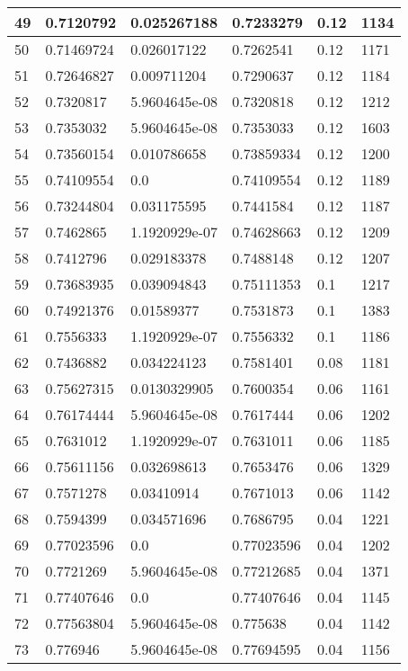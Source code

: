 \begin{longtable}{|l|l|l|l|l|l|}
49 & 0.7120792 & 0.025267188 & 0.7233279 & 0.12 & 1134 \\ \hline 
50 & 0.71469724 & 0.026017122 & 0.7262541 & 0.12 & 1171 \\ \hline 
51 & 0.72646827 & 0.009711204 & 0.7290637 & 0.12 & 1184 \\ \hline 
52 & 0.7320817 & 5.9604645e-08 & 0.7320818 & 0.12 & 1212 \\ \hline 
53 & 0.7353032 & 5.9604645e-08 & 0.7353033 & 0.12 & 1603 \\ \hline 
54 & 0.73560154 & 0.010786658 & 0.73859334 & 0.12 & 1200 \\ \hline 
55 & 0.74109554 & 0.0 & 0.74109554 & 0.12 & 1189 \\ \hline 
56 & 0.73244804 & 0.031175595 & 0.7441584 & 0.12 & 1187 \\ \hline 
57 & 0.7462865 & 1.1920929e-07 & 0.74628663 & 0.12 & 1209 \\ \hline 
58 & 0.7412796 & 0.029183378 & 0.7488148 & 0.12 & 1207 \\ \hline 
59 & 0.73683935 & 0.039094843 & 0.75111353 & 0.1 & 1217 \\ \hline 
60 & 0.74921376 & 0.01589377 & 0.7531873 & 0.1 & 1383 \\ \hline 
61 & 0.7556333 & 1.1920929e-07 & 0.7556332 & 0.1 & 1186 \\ \hline 
62 & 0.7436882 & 0.034224123 & 0.7581401 & 0.08 & 1181 \\ \hline 
63 & 0.75627315 & 0.0130329905 & 0.7600354 & 0.06 & 1161 \\ \hline 
64 & 0.76174444 & 5.9604645e-08 & 0.7617444 & 0.06 & 1202 \\ \hline 
65 & 0.7631012 & 1.1920929e-07 & 0.7631011 & 0.06 & 1185 \\ \hline 
66 & 0.75611156 & 0.032698613 & 0.7653476 & 0.06 & 1329 \\ \hline 
67 & 0.7571278 & 0.03410914 & 0.7671013 & 0.06 & 1142 \\ \hline 
68 & 0.7594399 & 0.034571696 & 0.7686795 & 0.04 & 1221 \\ \hline 
69 & 0.77023596 & 0.0 & 0.77023596 & 0.04 & 1202 \\ \hline 
70 & 0.7721269 & 5.9604645e-08 & 0.77212685 & 0.04 & 1371 \\ \hline 
71 & 0.77407646 & 0.0 & 0.77407646 & 0.04 & 1145 \\ \hline 
72 & 0.77563804 & 5.9604645e-08 & 0.775638 & 0.04 & 1142 \\ \hline 
73 & 0.776946 & 5.9604645e-08 & 0.77694595 & 0.04 & 1156 \\ \hline 

\end{longtable}
